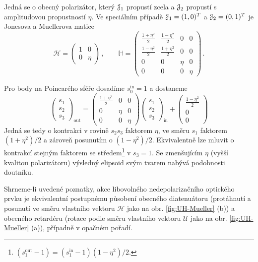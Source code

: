 Jedná se o obecný polarizátor, který $\mathcal{J}_1$ propustí zcela a $\mathcal{J}_2$ propustí s amplitudovou propustností $\eta$.
Ve speciálním případě $\mathcal{J}_1=(1,0)^T$ a $\mathcal{J}_2=(0,1)^T$ je Jonesova a Muellerova matice
\begin{equation}
    \mathcal{H}=\begin{pmatrix}
        1 & 0 \\ 0 & \eta
        \end{pmatrix} \,, \qquad
    \mathbb{H}=\begin{pmatrix}
        \frac{1+\eta^2}{2} & \frac{1-\eta^2}{2} & 0 & 0 \\ \frac{1-\eta^2}{2} & \frac{1+\eta^2}{2} & 0 & 0 \\
        0 & 0 & \eta & 0 \\ 0 & 0 & 0 & \eta
        \end{pmatrix} \,.
\end{equation}

Pro body na Poincarého sféře dosadíme $s_0^\textrm{in}=1$ a dostaneme
\begin{equation}
    \begin{pmatrix} s_1 \\ s_2 \\ s_3 \end{pmatrix}_{\textrm{out}}
    =\begin{pmatrix} \frac{1+\eta^2}{2} & 0 & 0 \\ 0 & \eta & 0 \\ 0 & 0 & \eta \end{pmatrix}
    \begin{pmatrix} s_1 \\ s_2 \\ s_3  \end{pmatrix}_{\textrm{in}}
    +\begin{pmatrix} \frac{1-\eta^2}{2} \\ 0 \\ 0 \end{pmatrix}
\end{equation}
Jedná se tedy o kontrakci v rovině $s_2s_3$ faktorem $\eta$, ve směru $s_1$ faktorem $(1+\eta^2)/2$ a zároveň posunutím o $(1-\eta^2)/2$.
Ekvivalentně lze mluvit o kontrakcí stejným faktorem se středem\footnote{$(s_1^\textrm{out}-1)=(s_1^\textrm{in}-1)(1-\eta^2)/2$.} v $s_3=1$.
Se zmenšujícím $\eta$ (vyšší kvalitou polarizátoru) výsledný elipsoid svým tvarem nabývá podobnosti doutníku.

Shrneme-li uvedené poznatky, akce libovolného nedepolarizačního optického prvku je ekvivalentní postupnému působení obecného diatenuátoru (protáhnutí a posunutí ve směru vlastního vektoru $\mathcal{H}$ jako na obr. \ref{fig:UH-Mueller} (b)) a obecného retardéru (rotace podle směru vlastního vektoru $\mathcal{U}$ jako na obr. \ref{fig:UH-Mueller} (a)), případně v opačném pořadí.

